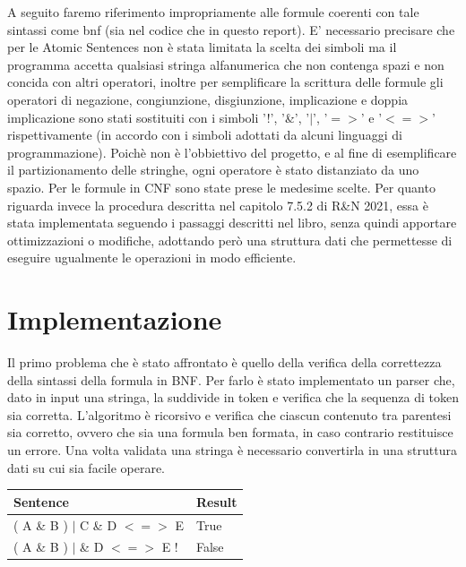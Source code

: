\documentclass{article} %
\begin{document}
A seguito faremo riferimento impropriamente alle formule coerenti con tale sintassi come bnf (sia nel codice che in questo report).
E' necessario precisare che per le Atomic Sentences non è stata limitata la scelta dei simboli ma il programma accetta qualsiasi stringa alfanumerica che non contenga spazi e non concida con altri operatori, inoltre per semplificare la scrittura delle formule gli operatori di negazione, congiunzione, disgiunzione, implicazione e doppia implicazione sono stati sostituiti con i simboli '!', '\&', '$|$', '$=>$' e '$<=>$' rispettivamente (in accordo con i simboli adottati da alcuni linguaggi di programmazione).
Poichè non è l'obbiettivo del progetto, e al fine di esemplificare il partizionamento delle stringhe, ogni operatore è stato distanziato da uno spazio.
Per le formule in CNF sono state prese le medesime scelte. 
Per quanto riguarda invece la procedura descritta nel capitolo 7.5.2 di R\&N 2021, essa è stata implementata seguendo i passaggi descritti nel libro, senza quindi apportare ottimizzazioni o modifiche, adottando però una struttura dati che permettesse di eseguire ugualmente le operazioni in modo efficiente.

\section*{Implementazione}  

Il primo problema che è stato affrontato è quello della verifica della correttezza della sintassi della formula in BNF. Per farlo è stato implementato un parser che, dato in input una stringa, la suddivide in token e verifica che la sequenza di token sia corretta.
L'algoritmo è ricorsivo e verifica che ciascun contenuto tra parentesi sia corretto, ovvero che sia una formula ben formata, in caso contrario restituisce un errore.
Una volta validata una stringa è necessario convertirla in una struttura dati su cui sia facile operare. 

\vspace{0.5cm}

\begin{tabular}{|p{5cm}|p{5cm}|}
    \textbf{Sentence} & \textbf{Result} \\ \hline
    ( A \& B ) $|$ C \& D $<=>$ E & True \\
    ( A \& B ) $|$ \& D $<=>$ E ! & False \\
\end{tabular}

\vspace{0.5cm}
\end{document}
